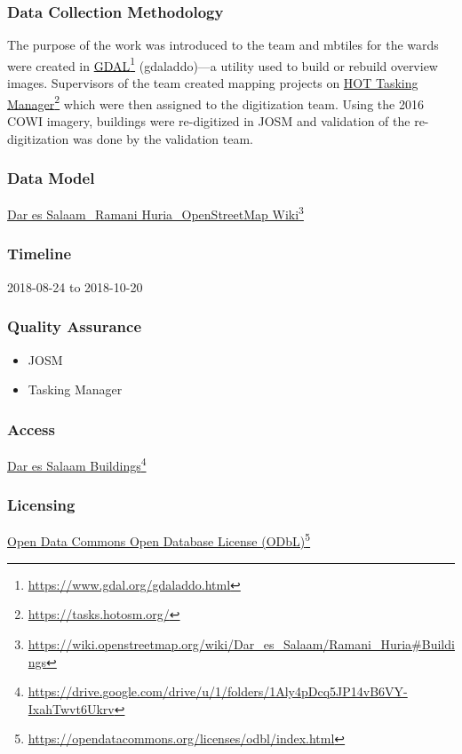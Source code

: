 \documentclass[a4paper,12pt,twoside]{article}
\begin{document}
\subsubsection{Data Collection Methodology}

The purpose of the work was introduced to the team and mbtiles for the wards were created in \href{https://www.gdal.org/gdaladdo.html}{GDAL}\footnote{\url{https://www.gdal.org/gdaladdo.html}} (gdaladdo)---a utility used to build or rebuild overview images. Supervisors of the team created mapping projects on \href{https://tasks.hotosm.org/}{HOT Tasking Manager}\footnote{\url{https://tasks.hotosm.org/}} which were then assigned to the digitization team. Using the 2016 COWI imagery, buildings were re-digitized in JOSM and validation of the re-digitization was done by the validation team.

\subsubsection{Data Model}
\href{https://wiki.openstreetmap.org/wiki/Dar_es_Salaam/Ramani_Huria\#Buildings}{Dar es Salaam\_Ramani Huria\_OpenStreetMap Wiki}\footnote{\url{https://wiki.openstreetmap.org/wiki/Dar_es_Salaam/Ramani_Huria\#Buildings}}

\subsubsection{Timeline}
2018-08-24 to 2018-10-20

\subsubsection{Quality Assurance}
\begin{itemize}
    \item JOSM
    \item Tasking Manager
\end{itemize}

\subsubsection{Access}
\href{https://drive.google.com/drive/u/1/folders/1Aly4pDcq5JP14vB6VY-IxahTwvt6Ukrv}{Dar es Salaam Buildings}\footnote{\url{https://drive.google.com/drive/u/1/folders/1Aly4pDcq5JP14vB6VY-IxahTwvt6Ukrv}}

\subsubsection{Licensing}
\href{https://opendatacommons.org/licenses/odbl/index.html}{Open Data Commons Open Database License (ODbL)}\footnote{\url{https://opendatacommons.org/licenses/odbl/index.html}}
\end{document}

